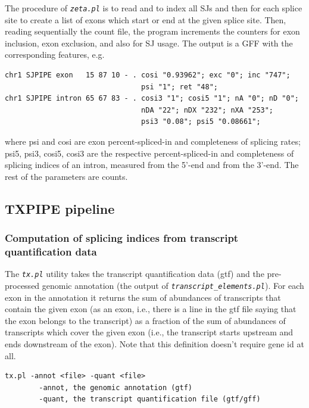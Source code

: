 \documentclass{article}
\newcommand{\prog}[1]{{\tt\em #1}}
\begin{document}
The procedure of \prog{zeta.pl} is to read and to index all SJs and then for each splice site to create a list of exons which start or end at the given splice site. 
Then, reading sequentially the count file, the program increments the counters for exon inclusion, exon exclusion, and also for SJ usage. The output is a GFF with 
the corresponding features, e.g.
\begin{verbatim}
chr1 SJPIPE exon   15 87 10 - . cosi "0.93962"; exc "0"; inc "747"; 
                                psi "1"; ret "48";
chr1 SJPIPE intron 65 67 83 - . cosi3 "1"; cosi5 "1"; nA "0"; nD "0"; 
                                nDA "22"; nDX "232"; nXA "253"; 
                                psi3 "0.08"; psi5 "0.08661";
\end{verbatim}
where psi and cosi are exon percent-spliced-in and completeness of splicing rates; psi5, psi3, cosi5, cosi3 
are the respective percent-spliced-in and completeness of splicing indices of an intron, measured from the 
5'-end and from the 3'-end. The rest of the parameters are counts.


\subsection{TXPIPE pipeline}
\label{sec::txpipe}
\subsubsection[Splicing indices from transcript quantification data]{Computation of splicing indices from transcript quantification data}

The \prog{tx.pl} utility takes the transcript quantification data (gtf) and the pre-processed genomic annotation (the output of
\prog{transcript\_elements.pl}). For each exon in the annotation it returns the sum of abundances of transcripts that contain 
the given exon (as an exon, i.e., there is a line in the gtf file saying that the exon belongs to the transcript) as a fraction 
of the sum of abundances of transcripts which cover the given exon (i.e., the transcript starts upstream and ends downstream of the 
exon). Note that this definition doesn't require gene id at all.

\begin{verbatim}
tx.pl -annot <file> -quant <file>
        -annot, the genomic annotation (gtf)
        -quant, the transcript quantification file (gtf/gff)
\end{verbatim}
\end{document}
